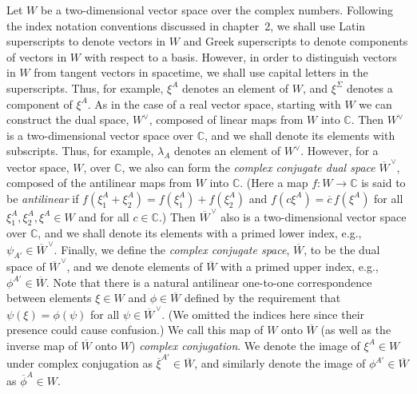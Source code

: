 Let \(W\) be a two-dimensional vector space over the complex numbers. Following the
index notation conventions discussed in chapter~2, we shall use Latin superscripts
to denote vectors in \(W\) and Greek superscripts to denote components of vectors in
\(W\) with respect to a basis. However, in order to distinguish vectors in \(W\) from
tangent vectors in spacetime, we shall use capital letters in the superscripts. Thus,
for example, \(\xi^A\) denotes an element of \(W\), and \(\xi^\Sigma\) denotes a
component of \(\xi^A\). As in the case of a real vector space, starting with \(W\) we
can construct the dual space, \(W^\vee\), composed of linear maps from \(W\) into
\(\mathbb C\). Then \(W^\vee\) is a two-dimensional vector space over \(\mathbb C\),
and we shall denote its elements with subscripts. Thus, for example, \(\lambda_A\)
denotes an element of \(W^\vee\). However, for a vector space, \(W\), over
\(\mathbb C\), we also can form the \emph{complex conjugate dual space}
\(\overline{W}^{\,\vee}\), composed of the antilinear maps from \(W\) into \(\mathbb C\).
(Here a map \(f:W\longrightarrow\mathbb C\) is said to be \emph{antilinear} if
\(f(\xi_1^A+\xi_2^A)=f(\xi_1^A)+f(\xi_2^A)\) and
\(f(c\xi^A)=\overline c\,f(\xi^A)\) for all \(\xi_1^A,\xi_2^A,\xi^A\in W\) and for
all \(c\in\mathbb C\).) Then \(\overline{W}^{\,\vee}\) also is a two-dimensional vector
space over \(\mathbb C\), and we shall denote its elements with a primed lower
index, e.g., \(\psi_{A'}\in\overline{W}^{\,\vee}\). Finally, we define the
\emph{complex conjugate space}, \(\overline W\), to be the dual space of
\(\overline{W}^{\,\vee}\), and we denote elements of \(\overline W\) with a primed
upper index, e.g., \(\phi^{A'}\in\overline W\). Note that there is a natural
antilinear one-to-one correspondence between elements \(\xi\in W\) and
\(\phi\in\overline W\) defined by the requirement that \(\psi(\xi)=\phi(\psi)\) for
all \(\psi\in\overline{W}^{\,\vee}\). (We omitted the indices here since their presence
could cause confusion.) We call this map of \(W\) onto \(\overline W\) (as well as
the inverse map of \(\overline W\) onto \(W\)) \emph{complex conjugation}. We denote
the image of \(\xi^A\in W\) under complex conjugation as
\(\overline\xi^{A'}\in\overline W\), and similarly denote the image of
\(\phi^{A'}\in\overline W\) as \(\overline\phi^A\in W\).

